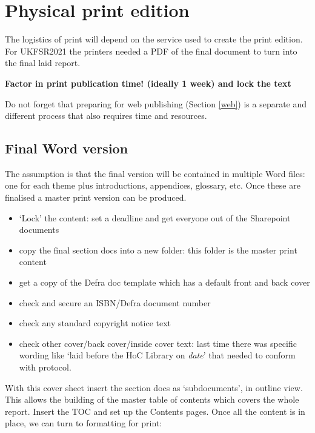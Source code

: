 \documentclass[
]{book}
\providecommand{\tightlist}{%
  \setlength{\itemsep}{0pt}\setlength{\parskip}{0pt}}
\begin{document}
\hypertarget{print}{%
\chapter{Physical print edition}\label{print}}

The logistics of print will depend on the service used to create the print
edition. For UKFSR2021 the printers needed a PDF of the final document to turn
into the final laid report.

\textbf{Factor in print publication time! (ideally 1 week) and lock the text}

Do not forget that preparing for web publishing (Section \ref{web}) is a separate and different process that also requires time and resources.

\hypertarget{final-word-version}{%
\section{Final Word version}\label{final-word-version}}

The assumption is that the final version will be contained in multiple Word files: one for each theme plus introductions, appendices, glossary, etc. Once these are finalised a master print version can be produced.

\begin{itemize}
\tightlist
\item
  `Lock' the content: set a deadline and get everyone out of the Sharepoint documents
\item
  copy the final section docs into a new folder: this folder is the master print content
\item
  get a copy of the Defra doc template which has a default front and back cover
\item
  check and secure an ISBN/Defra document number
\item
  check any standard copyright notice text
\item
  check other cover/back cover/inside cover text: last time there was specific wording like `laid before the HoC Library on \emph{date}' that needed to conform with protocol.
\end{itemize}

With this cover sheet insert the section docs as `subdocuments', in outline view. This allows the building of the master table of contents which covers the whole report. Insert the TOC and set up the Contents pages. Once all the content is in place, we can turn to formatting for print:
\end{document}
